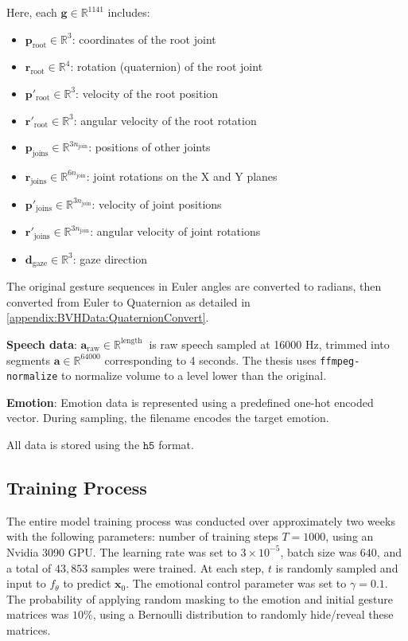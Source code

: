Here, each $\mathbf{g} \in \mathbb{R}^{1141}$ includes:
{
	\begin{itemize}
		\item $\mathbf{p}_{\text{root}} \in \mathbb{R}^3$: coordinates of the root joint
		\item $\mathbf{r}_{\text{root}} \in \mathbb{R}^4$: rotation (quaternion) of the root joint
		\item $\mathbf{p}'_{\text{root}} \in \mathbb{R}^3$: velocity of the root position
		\item $\mathbf{r}'_{\text{root}} \in \mathbb{R}^3$: angular velocity of the root rotation
		
		\item $\mathbf{p}_{\text{joins}} \in \mathbb{R}^{3 n_{\text{join} }}$: positions of other joints
		\item $\mathbf{r}_{\text{joins}} \in \mathbb{R}^{6 n_{\text{join} }}$: joint rotations on the X and Y planes
		\item $\mathbf{p}'_{\text{joins}} \in \mathbb{R}^{3n_{\text{join} }}$: velocity of joint positions
		\item $\mathbf{r}'_{\text{joins}} \in \mathbb{R}^{3n_{\text{join} }}$: angular velocity of joint rotations
		\item $\mathbf{d}_{\text{gaze}} \in \mathbb{R}^3$: gaze direction
\end{itemize}}

The original gesture sequences in Euler angles are converted to radians, then converted from Euler to Quaternion as detailed in \autoref{appendix:BVHData:QuaternionConvert}.

\textbf{Speech data}: $\mathbf{a}_{\text{raw}} \in \mathbb{R}^{ \text{length } }$ is raw speech sampled at 16000 Hz, trimmed into segments $\mathbf{a} \in \mathbb{R}^{64000}$ corresponding to 4 seconds. The thesis uses \texttt{ffmpeg-normalize} to normalize volume to a level lower than the original.

\textbf{Emotion}: Emotion data is represented using a predefined one-hot encoded vector. During sampling, the filename encodes the target emotion.

All data is stored using the $\texttt{h5}$ format.

\subsection{Training Process}

The entire model training process was conducted over approximately two weeks with the following parameters: number of training steps $T = 1000$, using an Nvidia 3090 GPU. The learning rate was set to $3 \times 10^{-5}$, batch size was $640$, and a total of $43,853$ samples were trained. At each step, $t$ is randomly sampled and input to $f_{\theta}$ to predict $\mathbf{x}_{0}$. The emotional control parameter was set to $\gamma = 0.1$. The probability of applying random masking to the emotion and initial gesture matrices was $10\%$, using a Bernoulli distribution to randomly hide/reveal these matrices.

